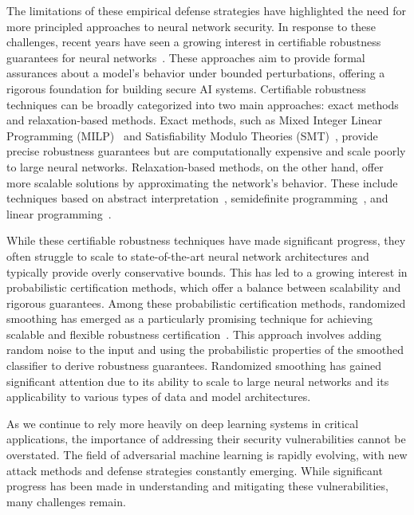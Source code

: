 The limitations of these empirical defense strategies have highlighted the need for more principled approaches to neural network security.
In response to these challenges, recent years have seen a growing interest in certifiable robustness guarantees for neural networks~\cite{cohen2019certified}.
These approaches aim to provide formal assurances about a model's behavior under bounded perturbations, offering a rigorous foundation for building secure AI systems.
Certifiable robustness techniques can be broadly categorized into two main approaches: exact methods and relaxation-based methods.
Exact methods, such as Mixed Integer Linear Programming (MILP)~\cite{tjeng2017evaluating} and Satisfiability Modulo Theories (SMT)~\cite{katz2017reluplex}, provide precise robustness guarantees but are computationally expensive and scale poorly to large neural networks.
Relaxation-based methods, on the other hand, offer more scalable solutions by approximating the network's behavior.
These include techniques based on abstract interpretation~\cite{gehr2018ai2}, semidefinite programming~\cite{raghunathan2018semidefinite}, and linear programming~\cite{wong2018provable}.

While these certifiable robustness techniques have made significant progress, they often struggle to scale to state-of-the-art neural network architectures and typically provide overly conservative bounds.
This has led to a growing interest in probabilistic certification methods, which offer a balance between scalability and rigorous guarantees.
Among these probabilistic certification methods, randomized smoothing has emerged as a particularly promising technique for achieving scalable and flexible robustness certification~\cite{lecuyer2019certified}.
This approach involves adding random noise to the input and using the probabilistic properties of the smoothed classifier to derive robustness guarantees.
Randomized smoothing has gained significant attention due to its ability to scale to large neural networks and its applicability to various types of data and model architectures.

As we continue to rely more heavily on deep learning systems in critical applications, the importance of addressing their security vulnerabilities cannot be overstated.
The field of adversarial machine learning is rapidly evolving, with new attack methods and defense strategies constantly emerging.
While significant progress has been made in understanding and mitigating these vulnerabilities, many challenges remain.

